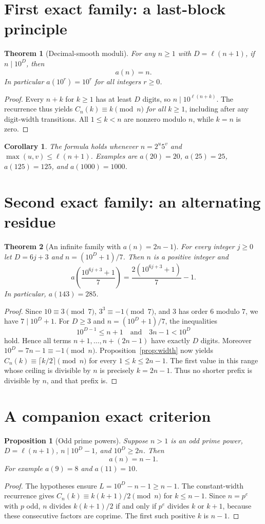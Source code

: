 \documentclass[10pt]{article}
\newtheorem{theorem}{Theorem}
\newtheorem{proposition}{Proposition}
\newtheorem{corollary}{Corollary}
\begin{document}
\section{First exact family: a last-block principle}
\begin{theorem}[Decimal-smooth moduli]\label{thm:smooth}
For any $n\ge1$ with $D=\ell(n+1)$, if $n\mid10^D$, then
\[\boxed{a(n)=n}.\]
In particular $a(10^r)=10^r$ for all integers $r\ge0$.
\end{theorem}
\begin{proof}
Every $n+k$ for $k\ge1$ has at least $D$ digits, so $n\mid10^{\ell(n+k)}$. The recurrence thus yields $C_n(k)\equiv k\pmod n$ \emph{for all} $k\ge1$, including after any digit-width transitions. All $1\le k<n$ are nonzero modulo $n$, while $k=n$ is zero.
\end{proof}
\begin{corollary}
The formula holds whenever $n=2^u5^v$ and $\max(u,v)\le\ell(n+1)$. Examples are $a(20)=20$, $a(25)=25$, $a(125)=125$, and $a(1000)=1000$.
\end{corollary}
\section{Second exact family: an alternating residue}
\begin{theorem}[An infinite family with $a(n)=2n-1$]\label{thm:seven}
For every integer $j\ge0$ let $D=6j+3$ and $n=(10^D+1)/7$. Then $n$ is a positive integer and
\[
 \boxed{a\left(\frac{10^{6j+3}+1}{7}\right)=\frac{2(10^{6j+3}+1)}7-1}.
\]
In particular, $a(143)=285$.
\end{theorem}
\begin{proof}
Since $10\equiv3\pmod7$, $3^3\equiv-1\pmod7$, and $3$ has order $6$ modulo $7$, we have $7\mid10^D+1$. For $D\ge3$ and $n=(10^D+1)/7$, the inequalities
\[
 10^{D-1}\le n+1\quad\text{and}\quad 3n-1<10^D
\]
hold. Hence all terms $n+1,\ldots,n+(2n-1)$ have exactly $D$ digits. Moreover $10^D=7n-1\equiv-1\pmod n$. Proposition~\ref{prop:width} now yields $C_n(k)\equiv\lceil k/2\rceil\pmod n$ for every $1\le k\le2n-1$. The first value in this range whose ceiling is divisible by $n$ is precisely $k=2n-1$. Thus no shorter prefix is divisible by $n$, and that prefix is.
\end{proof}
\section{A companion exact criterion}
\begin{proposition}[Odd prime powers]\label{prop:primepower}
Suppose $n>1$ is an odd prime power, $D=\ell(n+1)$, $n\mid10^D-1$, and $10^D\ge2n$. Then
\[\boxed{a(n)=n-1}.\]
For example $a(9)=8$ and $a(11)=10$.
\end{proposition}
\begin{proof}
The hypotheses ensure $L=10^D-n-1\ge n-1$. The constant-width recurrence gives $C_n(k)\equiv k(k+1)/2\pmod n$ for $k\le n-1$. Since $n=p^e$ with $p$ odd, $n$ divides $k(k+1)/2$ if and only if $p^e$ divides $k$ or $k+1$, because these consecutive factors are coprime. The first such positive $k$ is $n-1$.
\end{proof}
\end{document}
